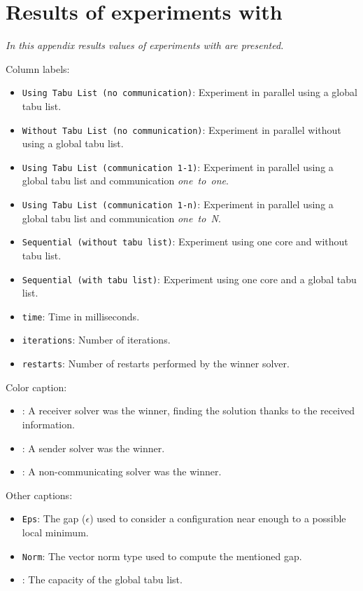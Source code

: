 \chapter{Results of experiments with \grp}
\label{app:grp}
\textit{In this appendix results values of experiments with \grp{} are presented.}
\vfill
\newpage

Column labels:
\begin{itemize}
\item \texttt{Using Tabu List (no communication)}: Experiment in parallel using a global tabu list.
\item \texttt{Without Tabu List (no communication)}: Experiment in parallel without using a global tabu list.
\item \texttt{Using Tabu List (communication 1-1)}: Experiment in parallel using a global tabu list and communication \textit{one~to~one}.
\item \texttt{Using Tabu List (communication 1-n)}: Experiment in parallel using a global tabu list and communication \textit{one~to~N}.
\item \texttt{Sequential (without tabu list)}: Experiment using one core and without tabu list.
\item \texttt{Sequential (with tabu list)}: Experiment using one core and a global tabu list.
\item \texttt{time}: Time in milliseconds. 
\item \texttt{iterations}: Number of iterations.
\item \texttt{restarts}: Number of restarts performed by the winner solver.
\end{itemize}

Color caption:
\begin{itemize}
\item {}: A receiver solver was the winner, finding the solution thanks to the received information.
\item {}: A sender solver was the winner.
\item {}: A non-communicating solver was the winner.
\end{itemize}

Other captions:
\begin{itemize}
\item \texttt{Eps}: The gap ($\epsilon$) used to consider a configuration near enough to a possible local minimum.
\item \texttt{Norm}: The vector norm type used to compute the mentioned gap.
\item {}: The capacity of the global tabu list.
\end{itemize}


\clearpage
